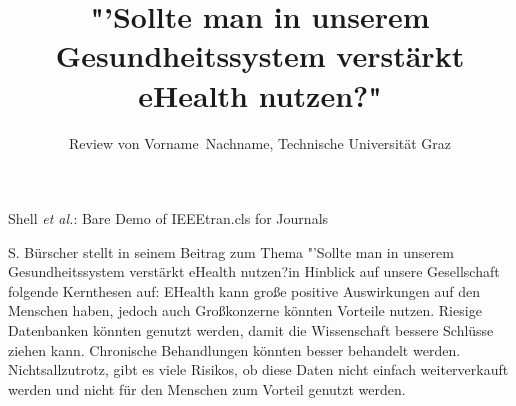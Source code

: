 \documentclass[journal]{IEEEtran}
\begin{document}
\title{"'Sollte man in unserem Gesundheitssystem verstärkt eHealth nutzen?"}
\author{Review von Vorname~Nachname, Technische Universität Graz}

    {Shell \MakeLowercase{\textit{et al.}}: Bare Demo of IEEEtran.cls for Journals}

\maketitle

    


\IEEEpeerreviewmaketitle
S. Bürscher stellt in seinem Beitrag zum Thema "'Sollte man in unserem Gesundheitssystem verstärkt 
eHealth nutzen?\grqq in Hinblick auf unsere Gesellschaft folgende Kernthesen auf: 
EHealth kann große positive Auswirkungen auf den Menschen haben, jedoch  auch Großkonzerne 
könnten Vorteile nutzen. Riesige Datenbanken könnten genutzt werden, damit die Wissenschaft 
bessere Schlüsse ziehen kann. Chronische Behandlungen könnten besser behandelt werden. 
Nichtsallzutrotz, gibt es viele Risikos, ob diese Daten nicht einfach weiterverkauft werden 
und nicht für den Menschen zum Vorteil genutzt werden. \\
\end{document}
